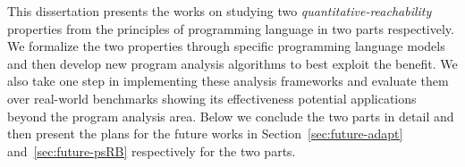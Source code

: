 This dissertation presents the works on studying two \emph{quantitative-reachability} properties from the principles of programming language in two parts respectively.
We formalize the two properties through specific programming language models and then develop new program analysis algorithms to best
exploit the benefit.
We also take one step in implementing these analysis frameworks and evaluate them over
real-world benchmarks showing its effectiveness 
potential applications beyond the program analysis area.
Below we conclude the two parts in detail and 
then present the plans for the future works in Section~\ref{sec:future-adapt} and~\ref{sec:future-psRB} respectively for the two parts. 
